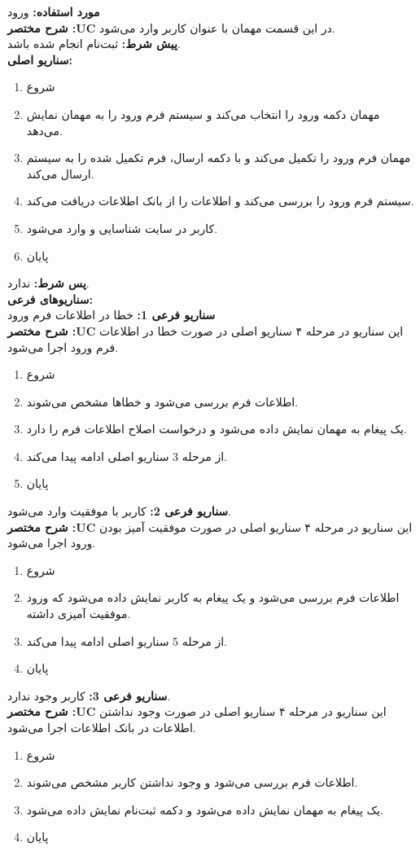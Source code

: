 \textbf{مورد استفاده:}
ورود
\\
\textbf{شرح مختصر :UC}
در این قسمت مهمان با عنوان کاربر وارد می‌شود.
\\
\textbf{پيش شرط:}
ثبت‌نام انجام شده باشد.
\\
\textbf{سناريو اصلی:}
\begin{enumerate}
\item
شروع
\item
مهمان دکمه ورود را انتخاب می‌کند و سیستم فرم ورود را به مهمان نمایش می‌دهد.
\item
مهمان فرم ورود را تکمیل می‌کند و با دکمه ارسال، فرم تکمیل شده را به سیستم ارسال می‌کند.
\item
سیستم فرم ورود را بررسی می‌کند و اطلاعات را از بانک اطلاعات دریافت می‌کند.
\item
کاربر در سایت شناسایی و وارد می‌شود.
\item
پایان
\end{enumerate}

\noindent
\textbf{پس شرط:}
ندارد.
\\
\textbf{سناريوهای فرعی:}
\\
\textbf{سناريو فرعی 1:}
خطا در اطلاعات فرم ورود
\\
\textbf{شرح مختصر :UC}
این سناریو در مرحله ۴ سناریو اصلی در صورت خطا در اطلاعات فرم ورود اجرا می‌شود.
\begin{enumerate}
\item
شروع
\item
اطلاعات فرم بررسی می‌شود و خطاها مشخص می‌شوند.
\item
یک پیغام به مهمان نمایش داده می‌شود و درخواست اصلاح اطلاعات فرم را دارد.
\item
از مرحله 3 سناریو اصلی ادامه پیدا می‌کند.
\item
پایان
\end{enumerate}

\noindent
\textbf{سناريو فرعی 2:}
کاربر با موفقیت وارد می‌شود.
\\
\textbf{شرح مختصر :UC}
این سناریو در مرحله ۴ سناریو اصلی در صورت موفقیت آمیز بودن ورود اجرا می‌شود.
\begin{enumerate}
\item
شروع
\item
اطلاعات فرم بررسی می‌شود و یک پیغام به کاربر نمایش داده می‌شود که ورود موفقیت آمیزی داشته.
\item
از مرحله 5 سناریو اصلی ادامه پیدا می‌کند.
\item
پایان
\end{enumerate}

\noindent
\textbf{سناريو فرعی 3:}
کاربر وجود ندارد.
\\
\textbf{شرح مختصر :UC}
این سناریو در مرحله ۴ سناریو اصلی در صورت وجود نداشتن اطلاعات در بانک اطلاعات اجرا می‌شود.
\begin{enumerate}
	\item
	شروع
	\item
	اطلاعات فرم بررسی می‌شود و وجود نداشتن کاربر مشخص می‌شوند.
	\item
	یک پیغام به مهمان نمایش داده می‌شود و دکمه ثبت‌نام نمایش داده می‌شود.
	\item
	پایان
\end{enumerate}

